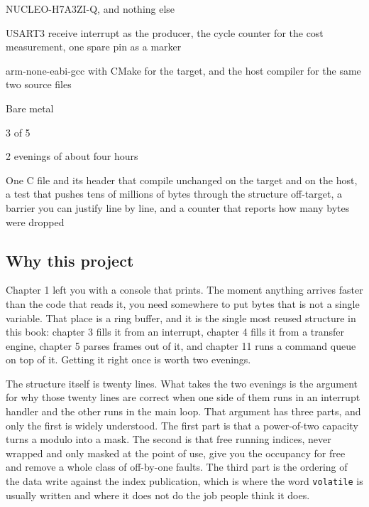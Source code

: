 
\begin{keyfacts}
\item[Board] NUCLEO-H7A3ZI-Q, and nothing else
\item[Peripherals] USART3 receive interrupt as the producer, the cycle counter for the cost measurement, one spare pin as a marker
\item[Toolchain] arm-none-eabi-gcc with CMake for the target, and the host compiler for the same two source files
\item[Operating system] Bare metal
\item[Difficulty] 3 of 5
\item[Effort] 2 evenings of about four hours
\item[Deliverable] One C file and its header that compile unchanged on the target and on the host, a test that pushes tens of millions of bytes through the structure off-target, a barrier you can justify line by line, and a counter that reports how many bytes were dropped
\end{keyfacts}

\subsection*{Why this project}

Chapter 1 left you with a console that prints. The moment anything arrives
faster than the code that reads it, you need somewhere to put bytes that is not
a single variable. That place is a ring buffer, and it is the single most reused
structure in this book: chapter 3 fills it from an interrupt, chapter 4 fills it
from a transfer engine, chapter 5 parses frames out of it, and chapter 11 runs a
command queue on top of it. Getting it right once is worth two evenings.

The structure itself is twenty lines. What takes the two evenings is the
argument for why those twenty lines are correct when one side of them runs in an
interrupt handler and the other runs in the main loop. That argument has three
parts, and only the first is widely understood. The first part is that a
power-of-two capacity turns a modulo into a mask. The second is that free running
indices, never wrapped and only masked at the point of use, give you the
occupancy for free and remove a whole class of off-by-one faults. The third part
is the ordering of the data write against the index publication, which is where
the word \texttt{volatile} is usually written and where it does not do the job
people think it does.

